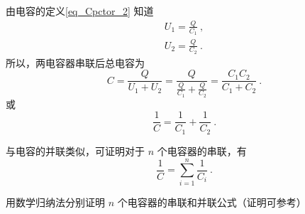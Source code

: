 由电容的定义\autoref{eq_Cpctor_2} 知道
\begin{equation}
\begin{aligned}
U_1=\frac{Q}{C_1}~,\\
U_2=\frac{Q}{C_2}~.
\end{aligned}
\end{equation}
所以，两电容器串联后总电容为
\begin{equation}
{C} = \frac{Q}{U_1+U_2} = \frac{Q}{\frac{Q}{C_1}+\frac{Q}{C_2}} = \frac{C_1C_2}{C_1 + C_2}~.
\end{equation}
或
\begin{equation}
\frac{1}{C}=\frac{1}{C_1}+\frac{1}{C_2}~.
\end{equation}

与电容的并联类似，可证明对于 $n$ 个电容器的串联，有
\begin{equation}
\frac{1}{C}=\sum_{i=1}^{n}\frac{1}{C_i}~.
\end{equation}
\begin{exercise}{}
用数学归纳法分别证明 $n$ 个电容器的串联和并联公式（证明可参考）
\end{exercise}
